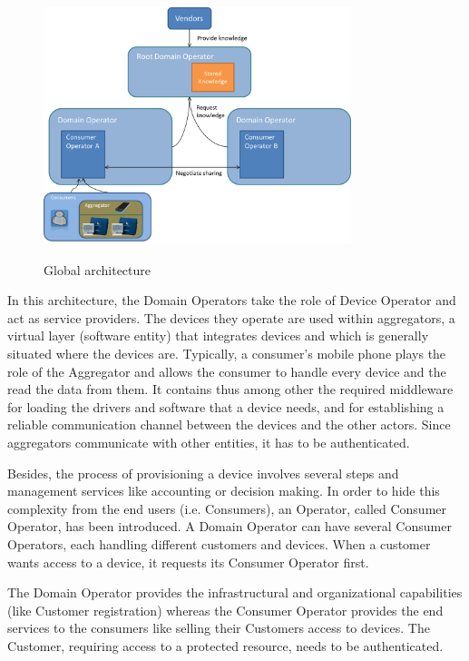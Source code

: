 \begin{figure}[!ht]
	\centering
	\includegraphics[width=0.8\textwidth]{images/design.png}\\
	\caption{Global architecture}
	\label{fig:concept__architecture}
\end{figure}

In this architecture, the Domain Operators take the role of Device Operator and act as service providers. The devices they operate are used within aggregators, a virtual layer (software entity) that integrates devices and which is generally situated where the devices are. Typically, a consumer's mobile phone plays the role of the Aggregator and allows the consumer to handle every device and the read the data from them. It contains thus among other the required middleware for loading the drivers and software that a device needs, and for establishing a reliable communication channel between the devices and the other actors. Since aggregators communicate with other entities, it has to be authenticated.

	Besides, the process of provisioning a device involves several steps and management services like accounting or decision making. In order to hide this complexity from the end users (i.e. Consumers), an Operator, called Consumer Operator, has been introduced. A Domain Operator can have several Consumer Operators, each handling different customers and devices. When a customer wants access to a device, it requests its Consumer Operator first.
	
	The Domain Operator provides the infrastructural and organizational capabilities (like Customer registration) whereas the Consumer Operator provides the end services to the consumers like selling their Customers access to devices. The Customer, requiring access to a protected resource, needs to be authenticated. 

